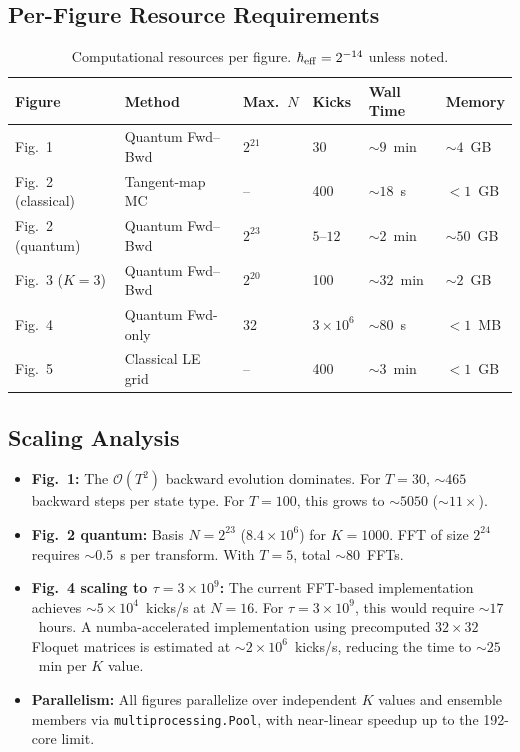 \documentclass[11pt,a4paper]{article}
\newcommand{\hb}{\hbar_{\rm eff}}
\begin{document}
\subsection{Per-Figure Resource Requirements}

\begin{table}[htbp]
\centering
\caption{Computational resources per figure. $\hb=2^{-14}$ unless noted.}
\label{tab:resources}
\begin{tabular}{@{}p{1.2cm}p{2.2cm}p{2cm}p{1.8cm}p{1.5cm}p{1.5cm}@{}}
\toprule
Figure & Method & Max.\ $N$ & Kicks & Wall Time & Memory \\
\midrule
Fig.~1 & Quantum Fwd--Bwd & $2^{21}$ & 30 & $\sim9$~min & $\sim4$~GB \\
Fig.~2 (classical) & Tangent-map MC & -- & 400 & $\sim18$~s & $<1$~GB \\
Fig.~2 (quantum) & Quantum Fwd--Bwd & $2^{23}$ & $5$--$12$ & $\sim2$~min & $\sim50$~GB \\
Fig.~3 ($K{=}3$) & Quantum Fwd--Bwd & $2^{20}$ & 100 & $\sim32$~min & $\sim2$~GB \\
Fig.~4 & Quantum Fwd-only & 32 & $3\times10^{6}$ & $\sim80$~s & $<1$~MB \\
Fig.~5 & Classical LE grid & -- & 400 & $\sim3$~min & $<1$~GB \\
\bottomrule
\end{tabular}
\end{table}

\subsection{Scaling Analysis}

\begin{itemize}[leftmargin=*]
\item \textbf{Fig.~1:} The $\mathcal{O}(T^{2})$ backward evolution dominates. For $T=30$, $\sim465$ backward steps per state type. For $T=100$, this grows to $\sim5050$ ($\sim11\times$).
\item \textbf{Fig.~2 quantum:} Basis $N=2^{23}$ ($8.4\times10^{6}$) for $K=1000$. FFT of size $2^{24}$ requires $\sim0.5$~s per transform. With $T=5$, total $\sim80$~FFTs.
\item \textbf{Fig.~4 scaling to $\tau=3\times10^{9}$:} The current FFT-based implementation achieves $\sim5\times10^{4}$~kicks/s at $N=16$. For $\tau=3\times10^{9}$, this would require $\sim17$~hours. A numba-accelerated implementation using precomputed $32\times32$ Floquet matrices is estimated at $\sim2\times10^{6}$~kicks/s, reducing the time to $\sim25$~min per $K$ value.
\item \textbf{Parallelism:} All figures parallelize over independent $K$ values and ensemble members via \texttt{multiprocessing.Pool}, with near-linear speedup up to the 192-core limit.
\end{itemize}
\end{document}
